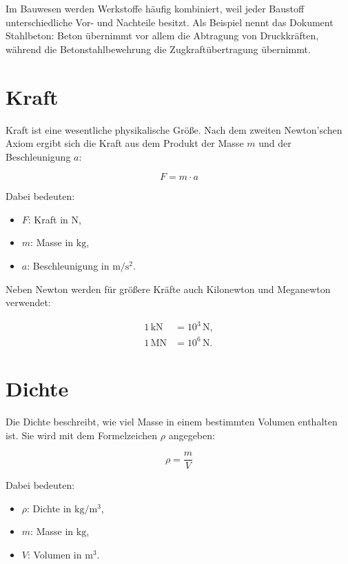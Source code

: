 \documentclass[
  12pt,
  a4paper,
  oneside
]{scrreprt}
\begin{document}
Im Bauwesen werden Werkstoffe häufig kombiniert, weil jeder Baustoff
unterschiedliche Vor- und Nachteile besitzt. Als Beispiel nennt das
Dokument Stahlbeton: Beton übernimmt vor allem die Abtragung von
Druckkräften, während die Betonstahlbewehrung die Zugkraftübertragung
übernimmt. 

\section{Kraft}

Kraft ist eine wesentliche physikalische Größe. Nach dem zweiten
Newton'schen Axiom ergibt sich die Kraft aus dem Produkt der Masse $m$
und der Beschleunigung $a$:

\begin{equation}
  F = m \cdot a
\end{equation}

Dabei bedeuten:

\begin{itemize}
  \item $F$: Kraft in $\mathrm{N}$,
  \item $m$: Masse in $\mathrm{kg}$,
  \item $a$: Beschleunigung in $\mathrm{m/s^2}$.
\end{itemize}



Neben Newton werden für größere Kräfte auch Kilonewton und Meganewton
verwendet:

\begin{align}
  1\,\mathrm{kN} &= 10^3\,\mathrm{N}, \\
  1\,\mathrm{MN} &= 10^6\,\mathrm{N}.
\end{align}



\section{Dichte}

Die Dichte beschreibt, wie viel Masse in einem bestimmten Volumen
enthalten ist. Sie wird mit dem Formelzeichen $\rho$ angegeben:

\begin{equation}
  \rho = \frac{m}{V}
\end{equation}

Dabei bedeuten:

\begin{itemize}
  \item $\rho$: Dichte in $\mathrm{kg/m^3}$,
  \item $m$: Masse in $\mathrm{kg}$,
  \item $V$: Volumen in $\mathrm{m^3}$.
\end{itemize}
\end{document}
